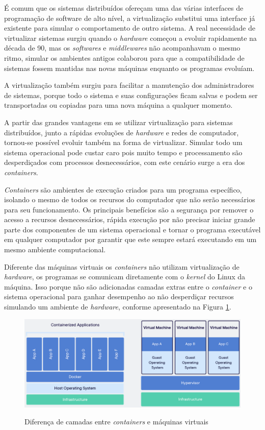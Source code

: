 	É comum que os sistemas distribuídos ofereçam uma das várias interfaces de programação de software de alto nível, a virtualização substitui uma interface já existente para simular o comportamento de outro sistema. A real necessidade de virtualizar sistemas surgiu quando o \textit{hardware} começou a evoluir rapidamente na década de 90, mas os \textit{softwares} e \textit{middlewares} não acompanhavam o mesmo ritmo, simular os ambientes antigos colaborou para que a compatibilidade de sistemas fossem mantidas nas novas máquinas enquanto os programas evoluíam.
	
	A virtualização também surgiu para facilitar a manutenção dos administradores de sistemas, porque todo o sistema e suas configurações ficam salvas e podem ser transportadas ou copiadas para uma nova máquina a qualquer momento.
	
	A partir das grandes vantagens em se utilizar virtualização para sistemas distribuídos, junto a rápidas evoluções de \textit{hardware} e redes de computador, tornou-se possível evoluir também na forma de virtualizar. Simular todo um sistema operacional pode custar caro pois muito tempo e processamento são desperdiçados com processos desnecessários, com este cenário surge a era dos \textit{containers}.
	
	\textit{Containers} são ambientes de execução criados para um programa específico, isolando o mesmo de todos os recursos do computador que não serão necessários para seu funcionamento. Os principais benefícios são a segurança por remover o acesso a recursos desnecessários, rápida execução por não precisar iniciar grande parte dos componentes de um sistema operacional e tornar o programa executável em qualquer computador por garantir que este sempre estará executando em um mesmo ambiente computacional.

	Diferente das máquinas virtuais os \textit{containers} não utilizam virtualização de \textit{hardware}, os programas se comunicam diretamente com o \textit{kernel} do Linux da máquina. Isso porque não são adicionadas camadas extras entre o \textit{container} e o sistema operacional para ganhar desempenho ao não desperdiçar recursos simulando um ambiente de \textit{hardware}, conforme apresentado na Figura \ref{fig:Docker-container-vm}.

	\begin{figure}[htb]
		\caption{Diferença de camadas entre \textit{containers} e máquinas virtuais}
		{\parbox{6cm}{
				\includegraphics[width=15cm]{images/container_x_vm.png}
				\label{fig:Docker-container-vm}
		}}
	\end{figure}

